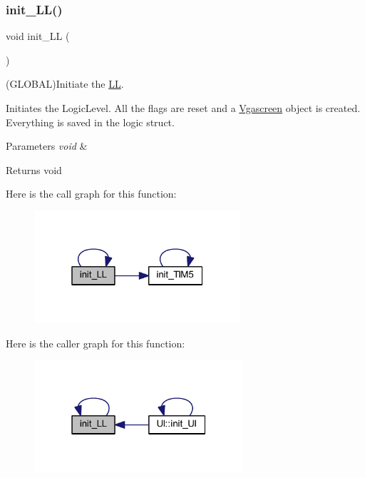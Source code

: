 \mbox{\label{namespace_l_l_a201bbec5c7219ca80c90d31b0a31b482}} 
\subsubsection{\texorpdfstring{init\+\_\+\+L\+L()}{init\_LL()}}
{\footnotesize\ttfamily void init\+\_\+\+LL (\begin{DoxyParamCaption}\item[{void}]{ }\end{DoxyParamCaption})}



(G\+L\+O\+B\+AL)Initiate the \mbox{\hyperlink{namespace_l_l}{LL}}. 

Initiates the Logic\+Level. All the flags are reset and a \mbox{\hyperlink{class_vgascreen}{Vgascreen}} object is created. Everything is saved in the logic struct.


\begin{DoxyParams}{Parameters}
{\em void} & \\
\hline
\end{DoxyParams}
\begin{DoxyReturn}{Returns}
void 
\end{DoxyReturn}
Here is the call graph for this function\+:\nopagebreak
\begin{figure}[H]
\begin{center}
\leavevmode
\includegraphics[width=217pt]{namespace_l_l_a201bbec5c7219ca80c90d31b0a31b482_cgraph}
\end{center}
\end{figure}
Here is the caller graph for this function\+:\nopagebreak
\begin{figure}[H]
\begin{center}
\leavevmode
\includegraphics[width=220pt]{namespace_l_l_a201bbec5c7219ca80c90d31b0a31b482_icgraph}
\end{center}
\end{figure}
\mbox{\label{namespace_l_l_a559eb54e37dc62032e9774315c2b4638}} 
